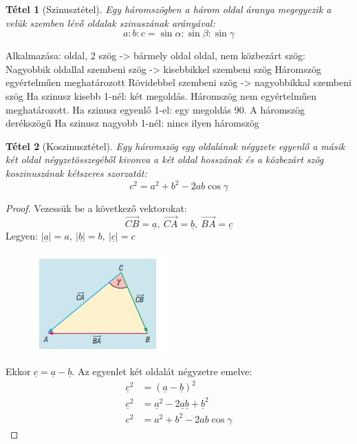 \documentclass[twoside,12pt]{report}
\renewcommand{\vec}{\underline}
\newtheorem{theorem}{Tétel}[section]
\theoremstyle{definition}
\begin{document}
	\begin{theorem}[Szinusztétel]
		Egy háromszögben a három oldal áranya megegyezik a velük szemben lévő oldalak szinuszának arányával:
		\begin{equation*}
			a:b:c=\sin\alpha:\sin\beta:\sin\gamma
		\end{equation*}
	\end{theorem}
	\begin{outline}
		\1 Alkalmazása:
			 oldal, 2 szög -> bármely oldal
			 oldal, nem közbezárt szög:
				\3 Nagyobbik oldallal szembeni szög -> kisebbikkel szembeni szög
					\4 Háromszög egyértelműen meghatározott
				\3 Rövidebbel szembeni szög -> nagyobbikkal szembeni szög
					\4 Ha szinusz kisebb 1-nél: két megoldás. Háromszög nem egyértelműen meghatározott.
					\4 Ha szinusz egyenlő 1-el: egy megoldás 90\degree. A háromszög derékszögű
					\4 Ha szinusz nagyobb 1-nél: nincs ilyen háromszög
	\end{outline}
	\begin{theorem}[Koszinusztétel]
		Egy háromszög egy oldalának négyzete egyenlő a másik két oldal négyzetösszegéből kivonva a két oldal hosszának és a közbezárt szög koszinuszának kétszeres szorzatát:
		\begin{equation*}
			c^2=a^2+b^2-2ab\cos\gamma
		\end{equation*}
	\end{theorem}
	\begin{proof}
		Vezessük be a következő vektorokat:
		\begin{equation*}
			\overrightarrow{CB}=\underline{a},\ \overrightarrow{CA}=\underline{b},\ \overrightarrow{BA}=\underline{c}
		\end{equation*}
		Legyen: $|\underline{a}|=a,\ |\underline{b}|=b,\ |\underline{c}|=c$
		\begin{figure}[H]
			\centering
			\includegraphics[width=0.5\linewidth]{Cos}
		\end{figure}
		Ekkor $\underline{c}=\vec{a}-\vec{b}$. Az egyenlet két oldalát négyzetre emelve:
		\begin{align*}
			\vec{c}^2&=(\vec{a}-\vec{b})^2\\
			\vec{c}^2&=\vec{a}^2-2\vec{a}\vec{b}+\vec{b}^2\\
			c^2&=a^2+b^2-2ab\cos\gamma
		\end{align*}
	\end{proof}
\end{document}
